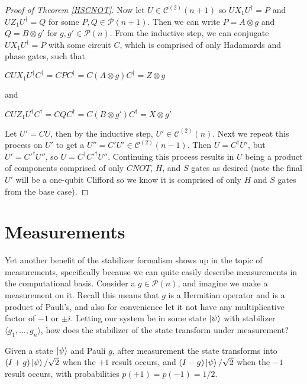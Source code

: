 \documentclass[12pt]{dalthesis}
\begin{document}
\begin{proof}[Proof of Theorem \ref{HSCNOT}]
Now let $U \in \mathcal{C}^{(2)}(n+1)$ so $UX_1U^\dag = P$ and $UZ_1U^\dag = Q$ for some $P, Q \in \mathcal{P}(n+1)$. Then we can write $P = A \otimes g$ and $Q = B \otimes g'$ for $g, g' \in \mathcal{P}(n)$. From the inductive step, we can conjugate $UX_1U^\dag = P$ with some circuit $C$, which is comprised of only Hadamards and phase gates, such that 
\begin{center}
$CUX_1U^\dag C^\dag = CPC^\dag = C(A \otimes g)C^\dag = Z \otimes g$
\end{center}
and 
\begin{center}
$CUZ_1U^\dag C^\dag = CQC^\dag = C(B \otimes g')C^\dag = X \otimes g'$
\end{center}
Let $U' = CU$, then by the inductive step, $U' \in \mathcal{C}^{(2)}(n)$. Next we repeat this process on $U'$ to get a $U'' = C'U' \in \mathcal{C}^{(2)}(n-1)$. Then $U = C^\dag U'$, but $U' = C'^\dag U''$, so $U = C^\dag C'^\dag U''$. Continuing this process results in $U$ being a product of components comprised of only $CNOT$, $H$, and $S$ gates as desired (note the final $U'$ will be a one-qubit Clifford so we know it is comprised of only $H$ and $S$ gates from the base case).
\end{proof}

\section{Measurements}
Yet another benefit of the stabilizer formalism shows up in the topic of measurements, specifically because we can quite easily describe measurements in the computational basis. Consider a $g \in \mathcal{P}(n)$, and imagine we make a measurement on it. Recall this means that $g$ is a Hermitian operator and is a product of Pauli's, and also for convenience let it not have any multiplicative factor of $-1$ or $\pm i$. Letting our system be in some state $\ket{\psi}$ with stabilizer $\langle g_1, \dots , g_n \rangle $, how does the stabilizer of the state transform under measurement? 

\begin{proposition}
Given a state $\ket{\psi}$ and Pauli $g$, after measurement the state transforms into $(I + g)\ket{\psi}/\sqrt{2}$ when the $+1$ result occurs, and $(I - g)\ket{\psi}/\sqrt{2}$ when the $-1$ result occurs, with probabilities $p(+1) = p(-1) = 1/2$.
\end{proposition}
\end{document}
